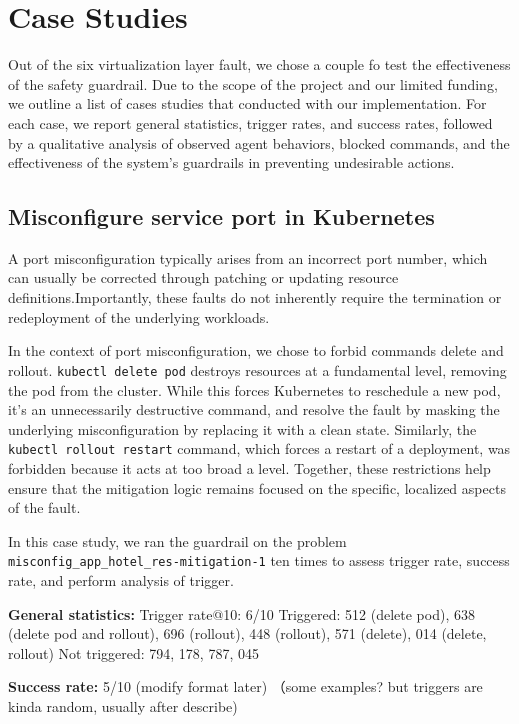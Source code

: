 \section{Case Studies}
Out of the six virtualization layer fault, we chose a couple fo test the effectiveness of the safety guardrail. Due to the scope of the project and our limited funding, we outline a list of cases studies that conducted with our implementation. For each case, we report general statistics, trigger rates, and success rates, followed by a qualitative analysis of observed agent behaviors, blocked commands, and the effectiveness of the system’s guardrails in preventing undesirable actions.



\subsection{Misconfigure service port in Kubernetes}
A port misconfiguration typically arises from an incorrect port number, which can usually be corrected through patching or updating resource definitions.Importantly, these faults do not inherently require the termination or redeployment of the underlying workloads.

In the context of port misconfiguration, we chose to forbid commands delete and rollout. \texttt{kubectl delete pod}  destroys resources at a fundamental level, removing the pod from the cluster. While this forces Kubernetes to reschedule a new pod, it's an unnecessarily destructive command, and resolve the fault by masking the underlying misconfiguration by replacing it with a clean state. Similarly, the \texttt{kubectl rollout restart}  command, which forces a restart of a deployment, was forbidden because it acts at too broad a level. Together, these restrictions help ensure that the mitigation logic remains focused on the specific, localized aspects of the fault. 

In this case study, we ran the guardrail on the problem  \texttt{misconfig\_app\_hotel\_res-mitigation-1} ten times to assess trigger rate, success rate, and perform analysis of trigger. 

\textbf{General statistics:}
Trigger rate@10: 6/10
Triggered: 512 (delete pod), 638 (delete pod and rollout), 696 (rollout), 448 (rollout), 571 (delete), 014 (delete, rollout)
Not triggered: 794, 178, 787, 045

\textbf{Success rate:} 5/10
(modify format later)
（some examples? but triggers are kinda random, usually after describe)

